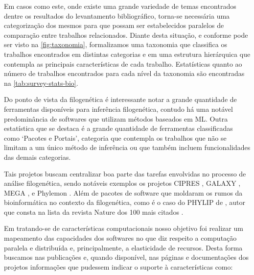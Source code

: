 \documentclass[english,brazilian]{UNISINOSmonografia} %
\begin{document}
Em casos como este, onde existe uma grande variedade de temas encontrados dentre os resultados do levantamento bibliográfico, torna-se necessária uma categorização dos mesmos para que possam ser estabelecidos paralelos de comparação entre trabalhos relacionados.
Diante desta situação, e conforme pode ser visto na \autoref{fig:taxonomia}, formalizamos uma taxonomia que classifica os trabalhos encontrados em distintas categorias e em uma estrutura hierárquica que contempla as principais características de cada trabalho.
Estatísticas quanto ao número de trabalhos encontrados para cada nível da taxonomia são encontradas na \autoref{tab:survey-stats-bio}.


Do ponto de vista da filogenética é interessante notar a grande quantidade de ferramentas disponíveis para inferência filogenética, contudo há uma notável predominância de softwares que utilizam métodos baseados em ML.
Outra estatística que se destaca é a grande quantidade de ferramentas classificadas como `Pacotes e Portais', categoria que contempla os trabalhos que não se limitam a um único método de inferência ou que também incluem funcionalidades das demais categorias.


Tais projetos buscam centralizar boa parte das tarefas envolvidas no processo de análise filogenética, sendo notáveis exemplos os projetos CIPRES \cite{Miller2010}, GALAXY \cite{Afgan2016}, MEGA \cite{Kumar2016}, e Phylemon \cite{Tarraga2007,Sanchez2011}.
Além de pacotes de software que moldaram os rumos da bioinformática no contexto da filogenética, como é o caso do PHYLIP de , autor que consta na lista da revista Nature dos 100 mais citados \cite{NatureTop100}.


Em tratando-se de características computacionais nosso objetivo foi realizar um mapeamento das capacidades dos softwares no que diz respeito a computação paralela e distribuída e, principalmente, a elasticidade de recursos.
Desta forma buscamos nas publicações e, quando disponível, nas páginas e documentações dos projetos informações que pudessem indicar o suporte à características como:
\end{document}
